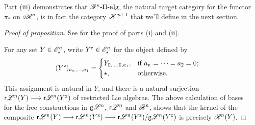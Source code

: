 \documentclass[11pt]{article}
\newcommand{\GpS}[1]{\scrE^{#1}_\star}
\newcommand{\RestLie}[1]{\mathsf{r}{\scrL}^{#1}}%
\newcommand{\GoodLie}[1]{\mathsf{g}{\scrL}^{#1}}%
\newcommand{\PRLie}[1]{\scrR^{#1}}%
\newcommand{\LL}[1]{{\scrK}^{#1}}%
\newcommand{\PiAlg}[1]{#1\textup{-$\Pi$-alg}}
\newcommand{\Fr}[1]{#1}%
\begin{document}
\begin{CategoriesOfInterest}
Part (iii) demonstrates that $\PiAlg{\PRLie{n}}$, the natural target category for the functor $\pi_*$ on $s\PRLie{n}$, is in fact the category $\LL{n+1}$ that we'll define in the next section.
\begin{proof}[Proof of proposition]
See
\cite[Thm 8.8 and proof]{CurtisSimplicialHtpy.pdf} for the proof of parts (i) and (ii).

For any set $Y\in\GpS{n}$, write $Y^\textup{z}\in\GpS{n}$ for the object defined by
\[(Y^\textup{z})_{a_n,\ldots,a_1}=\begin{cases}
Y_{0,\ldots,0,a_1},&\textup{if }a_n=\cdots =a_2=0;\\
\star,&\textup{otherwise}.
\end{cases}
\]
This assignment is natural in $Y$, and there is a natural surjection $\Fr\RestLie{n}(Y)\to\Fr\RestLie{n}(Y^\textup{z})$ of restricted Lie algebras. The above calculation of bases for the free constructions in $\GoodLie{n}$, $\RestLie{n}$ and $\PRLie{n}$, shows that the kernel of the composite $\Fr\RestLie{n}(Y)\to\Fr\RestLie{n}(Y^\textup{z})\to\Fr\RestLie{n}(Y^\textup{z})/\Fr\GoodLie{n}(Y^\textup{z})$ is precisely $\Fr{\PRLie{n}}(Y)$.


\end{proof}
\end{CategoriesOfInterest}
\end{document}
